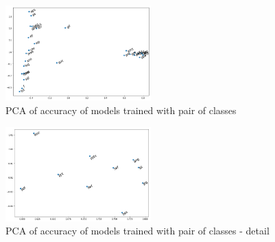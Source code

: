 \noindent
\begin{figure}[htb!]
\centering\includegraphics[width=0.50\textwidth]{content/pca.png}
\caption{\label{fig:pca}PCA of accuracy of models trained with pair of classes}%
\end{figure}


\noindent
\begin{figure}[htb!]
\centering\includegraphics[width=0.50\textwidth]{content/pca2.png}
\caption{\label{fig:pca2}PCA of accuracy of models trained with pair of classes - detail}%
\end{figure}


